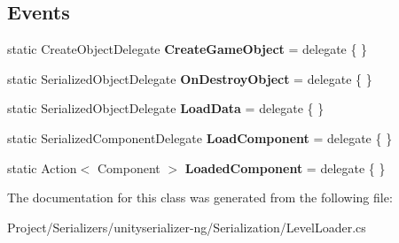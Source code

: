 \subsection*{Events}
\begin{DoxyCompactItemize}
\item 
\mbox{\label{class_level_loader_a6467f227c2897f195d6c9f611d816cca}} 
static Create\+Object\+Delegate {\bfseries Create\+Game\+Object} = delegate \{ \}
\item 
\mbox{\label{class_level_loader_a5cdf0c07cc677bd052a4e4b11799eccc}} 
static Serialized\+Object\+Delegate {\bfseries On\+Destroy\+Object} = delegate \{ \}
\item 
\mbox{\label{class_level_loader_ae3f1e9846c9d625dfd2c522d35e5fa29}} 
static Serialized\+Object\+Delegate {\bfseries Load\+Data} = delegate \{ \}
\item 
\mbox{\label{class_level_loader_aeef57ebb788135e95410d8530a025403}} 
static Serialized\+Component\+Delegate {\bfseries Load\+Component} = delegate \{ \}
\item 
\mbox{\label{class_level_loader_a7db5619e1031ce444bcd94441ee4d1ac}} 
static Action$<$ Component $>$ {\bfseries Loaded\+Component} = delegate \{ \}
\end{DoxyCompactItemize}


The documentation for this class was generated from the following file\+:\begin{DoxyCompactItemize}
\item 
Project/\+Serializers/unityserializer-\/ng/\+Serialization/Level\+Loader.\+cs\end{DoxyCompactItemize}
